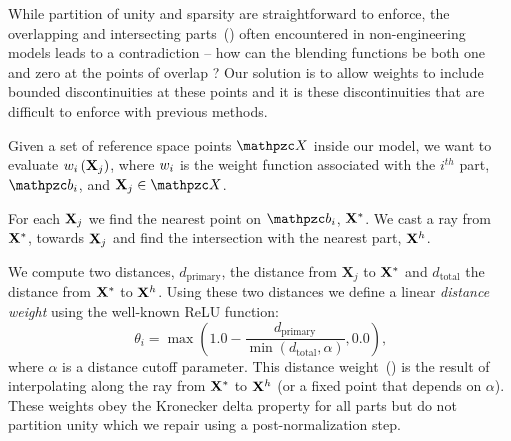 While partition of unity and sparsity are straightforward to enforce, the overlapping and intersecting parts~() often encountered in non-engineering models leads
to a contradiction -- how can the blending functions be both one and zero at the points of overlap ? 
Our solution is to allow weights to include bounded discontinuities at these points and it is these discontinuities that are difficult to enforce 
with previous methods. 

Given a set of reference space points $\st{X}$ inside our model, we want to evaluate $w_i\left(\mathbf{X}_j\right)$, where $w_i$ is the weight function associated with 
the $i^{th}$ part, $\prt_i$, and $\refX_j\in\st{X}$. 

For each $\mathbf{X}_j$ we find the nearest point on $\prt_i$, $\mathbf{X}^*$.
We cast a ray from $\mathbf{X}^*$, towards $\mathbf{X}_j$ and find the intersection with the nearest part, $\mathbf{X}^h$.

We compute two distances, $d_{\text{primary}}$, the distance from $\mathbf{X}_j$ to $\mathbf{X}^*$ and $d_{\text{total}}$ the distance from  $\mathbf{X}^*$ to $\mathbf{X}^h$.
Using these two distances we define a linear \emph{distance weight} using the well-known ReLU function:
\begin{equation}
\theta_i = \max (1.0 - \frac{d_{\text{primary}}}{\min (d_{\text{total}}, \alpha)}, 0.0)
\text{,}
\end{equation}
where $\alpha$ is a distance cutoff parameter. 
This distance weight~() is the result of interpolating along the ray from $\mathbf{X}^*$ to $\mathbf{X}^h$ (or a fixed point that depends on $\alpha$). 
These weights obey the Kronecker delta property for all parts but do not partition unity which we repair using a post-normalization step.


